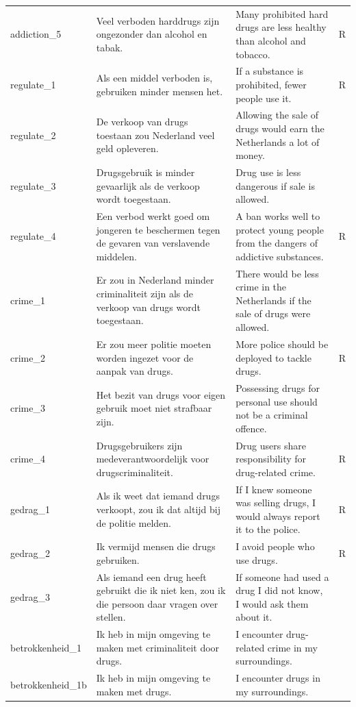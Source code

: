 \begin{table}[H]
\begin{tabularx}{\linewidth}{@{}l X X c@{}}
addiction\_5 & Veel verboden harddrugs zijn ongezonder dan alcohol en tabak. & Many prohibited hard drugs are less healthy than alcohol and tobacco. & R \\
\addlinespace
regulate\_1 & Als een middel verboden is, gebruiken minder mensen het. & If a substance is prohibited, fewer people use it. & R \\
regulate\_2 & De verkoop van drugs toestaan zou Nederland veel geld opleveren. & Allowing the sale of drugs would earn the Netherlands a lot of money. & \\
regulate\_3 & Drugsgebruik is minder gevaarlijk als de verkoop wordt toegestaan. & Drug use is less dangerous if sale is allowed. & \\
regulate\_4 & Een verbod werkt goed om jongeren te beschermen tegen de gevaren van verslavende middelen. & A ban works well to protect young people from the dangers of addictive substances. & R \\
\addlinespace
crime\_1 & Er zou in Nederland minder criminaliteit zijn als de verkoop van drugs wordt toegestaan. & There would be less crime in the Netherlands if the sale of drugs were allowed. & \\
crime\_2 & Er zou meer politie moeten worden ingezet voor de aanpak van drugs. & More police should be deployed to tackle drugs. & R \\
crime\_3 & Het bezit van drugs voor eigen gebruik moet niet strafbaar zijn. & Possessing drugs for personal use should not be a criminal offence. & \\
crime\_4 & Drugsgebruikers zijn medeverantwoordelijk voor drugscriminaliteit. & Drug users share responsibility for drug-related crime. & R \\
\addlinespace
gedrag\_1 & Als ik weet dat iemand drugs verkoopt, zou ik dat altijd bij de politie melden. & If I knew someone was selling drugs, I would always report it to the police. & R \\
gedrag\_2 & Ik vermijd mensen die drugs gebruiken. & I avoid people who use drugs. & R \\
gedrag\_3 & Als iemand een drug heeft gebruikt die ik niet ken, zou ik die persoon daar vragen over stellen. & If someone had used a drug I did not know, I would ask them about it. & \\
\addlinespace
betrokkenheid\_1 & Ik heb in mijn omgeving te maken met criminaliteit door drugs. & I encounter drug-related crime in my surroundings. & \\
betrokkenheid\_1b & Ik heb in mijn omgeving te maken met drugs. & I encounter drugs in my surroundings. & \\

\end{tabularx}
\end{table}
